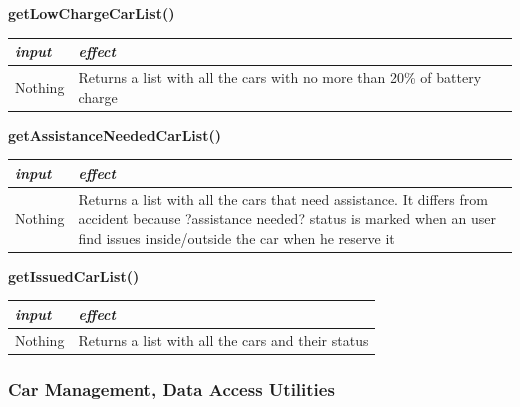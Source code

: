 \documentclass{article}
\begin{document}
\begin{flushleft}
  \begin{center}
   \begin {flushleft}
    \textbf{getLowChargeCarList()}
    \end{flushleft}
        \begin{tabular}{  |  p{6cm} | p{6cm} |}
    \hline
    \textit{input} &  \textit{effect} \\
    \hline
    
    Nothing & Returns a list with all the cars with no more than 20\% of battery charge 
     \\ 

  \hline
    \end{tabular}
\end{center}

  \begin{center}
   \begin {flushleft}
    \textbf{getAssistanceNeededCarList()}
    \end{flushleft}
        \begin{tabular}{  |  p{6cm} | p{6cm} |}
    \hline
    \textit{input} &  \textit{effect} \\
    \hline
    
    Nothing & Returns a list with all the cars that need assistance. It differs from accident because ?assistance needed? status is marked when an user find issues inside/outside the car when he reserve it 
     \\ 

  \hline
    \end{tabular}
\end{center}

  \begin{center}
   \begin {flushleft}
    \textbf{getIssuedCarList()}
    \end{flushleft}
        \begin{tabular}{  |  p{6cm} | p{6cm} |}
    \hline
    \textit{input} &  \textit{effect} \\
    \hline
    
    Nothing & Returns a list with all the cars and their status
     \\ 

  \hline
    \end{tabular}
\end{center}
    
    \newpage
    
     \subsubsection{Car Management, Data Access Utilities} %
     

\end{flushleft}
\end{document}
